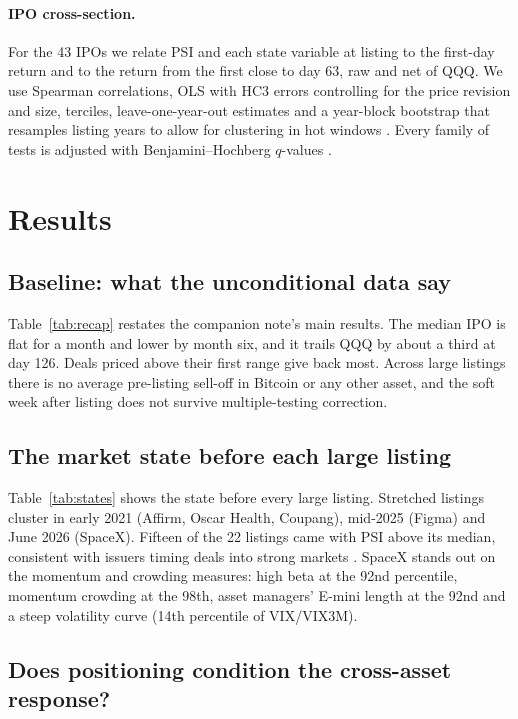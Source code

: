 \documentclass[11pt]{article}
\begin{document}
\paragraph{IPO cross-section.} For the 43 IPOs we relate PSI and each state variable at listing to the first-day return and to the return from the first close to day 63, raw and net of QQQ. We use Spearman correlations, OLS with HC3 errors controlling for the price revision and size, terciles, leave-one-year-out estimates and a year-block bootstrap that resamples listing years to allow for clustering in hot windows \citep{lowry2002}. Every family of tests is adjusted with Benjamini--Hochberg $q$-values \citep{benjamini1995}.

\section{Results}

\subsection{Baseline: what the unconditional data say}

Table~\ref{tab:recap} restates the companion note's main results. The median IPO is flat for a month and lower by month six, and it trails QQQ by about a third at day 126. Deals priced above their first range give back most. Across large listings there is no average pre-listing sell-off in Bitcoin or any other asset, and the soft week after listing does not survive multiple-testing correction.



\subsection{The market state before each large listing}

Table~\ref{tab:states} shows the state before every large listing. Stretched listings cluster in early 2021 (Affirm, Oscar Health, Coupang), mid-2025 (Figma) and June 2026 (SpaceX). Fifteen of the 22 listings came with PSI above its median, consistent with issuers timing deals into strong markets \citep{lowry2002}. SpaceX stands out on the momentum and crowding measures: high beta at the 92nd percentile, momentum crowding at the 98th, asset managers' E-mini length at the 92nd and a steep volatility curve (14th percentile of VIX/VIX3M).

\subsection{Does positioning condition the cross-asset response?}
\end{document}
